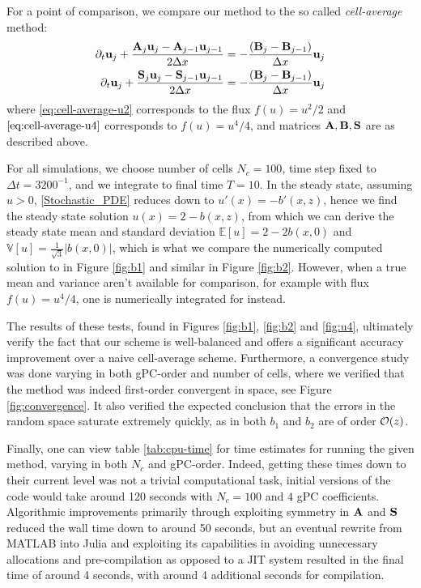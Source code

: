 \documentclass[12pt]{article}
\begin{document}
For a point of comparison, we compare our method to the so called \textit{cell-average} method:
\begin{align}
    \label{eq:cell-average-u2}
    \partial_t\vb{u}_j + \frac{\mathbf{{A}}_j \vb{u}_j - \mathbf{{A}}_{j-1}\vb{u}_{j-1}}{2\Delta x} &=- \frac{(\mathbf{{B}}_j-\mathbf{{B}}_{j-1})}{\Delta x}\vb{u}_j \\
    \label{eq:cell-average-u4}
    \partial_t\vb{u}_j + \frac{\mathbf{{S}}_j \vb{u}_j - \mathbf{{S}}_{j-1}\vb{u}_{j-1}}{2\Delta x} &=- \frac{(\mathbf{{B}}_j-\mathbf{{B}}_{j-1})}{\Delta x}\vb{u}_j
\end{align}
where \eqref{eq:cell-average-u2} corresponds to the flux $f(u) = u^2 / 2$ and $\eqref{eq:cell-average-u4}$ corresponds to $f(u) = u^4 / 4$, and matrices $\mathbf{{A}}, \mathbf{{B}}, \mathbf{{S}}$ are as described above.


For all simulations, we choose number of cells $N_c = 100$, time step fixed to $\Delta t = 3200^{-1}$, and we integrate to final time $T = 10$. 
In the steady state, assuming $u > 0$, \eqref{Stochastic_PDE} reduces down to $u'(x) = -b'(x,z)$, hence we find the steady state solution $u(x) = 2 - b(x,z)$, from which we can derive the steady state mean and standard deviation $\mathbb{E}[u] = 2 - 2b(x,0)$ and $\mathbb{V}[u] = \frac{1}{\sqrt{3}} |b(x,0)|$, which is what we compare the numerically computed solution to in Figure \ref{fig:b1} and similar in Figure \ref{fig:b2}.
However, when a true mean and variance aren't available for comparison, for example with flux $f(u) = u^4 / 4$, one is numerically integrated for instead.

The results of these tests, found in Figures \ref{fig:b1}, \ref{fig:b2} and \ref{fig:u4}, ultimately verify the fact that our scheme is well-balanced and offers a significant accuracy improvement over a naive cell-average scheme. 
Furthermore, a convergence study was done varying in both gPC-order and number of cells, where we verified that the method was indeed first-order convergent in space, see Figure \ref{fig:convergence}. 
It also verified the expected conclusion that the errors in the random space saturate extremely quickly, as in both $b_1$ and $b_2$ are of order $\mathcal{O}(z)$.

Finally, one can view table \ref{tab:cpu-time} for time estimates for running the given method, varying in both $N_c$ and gPC-order. 
Indeed, getting these times down to their current level was not a trivial computational task, initial versions of the code would take around 120 seconds with $N_c = 100$ and $4$ gPC coefficients.
Algorithmic improvements primarily through exploiting symmetry in $\mathbf{{A}}$ and $\mathbf{{S}}$ reduced the wall time down to around 50 seconds, but an eventual rewrite from MATLAB into Julia and exploiting its capabilities in avoiding unnecessary allocations and pre-compilation as opposed to a JIT system resulted in the final time of around 4 seconds, with around 4 additional seconds for compilation.
\end{document}
